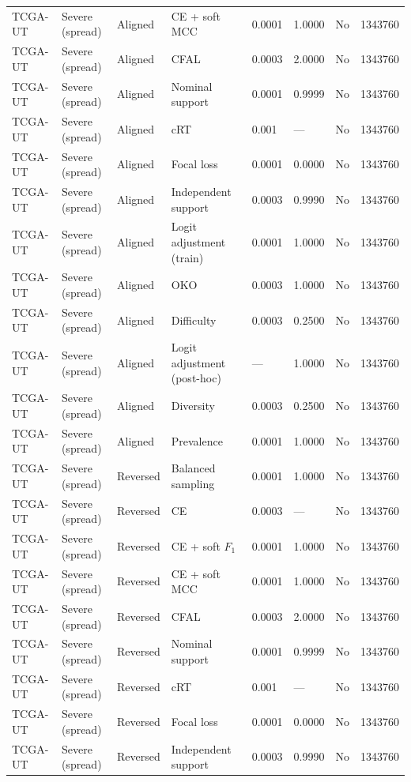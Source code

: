 \begin{longtable}{lllllllr}
TCGA-UT & Severe (spread) & Aligned & CE + soft MCC & 0.0001 & 1.0000 & No & 1343760 \\
TCGA-UT & Severe (spread) & Aligned & CFAL & 0.0003 & 2.0000 & No & 1343760 \\
TCGA-UT & Severe (spread) & Aligned & Nominal support & 0.0001 & 0.9999 & No & 1343760 \\
TCGA-UT & Severe (spread) & Aligned & cRT & 0.001 & --- & No & 1343760 \\
TCGA-UT & Severe (spread) & Aligned & Focal loss & 0.0001 & 0.0000 & No & 1343760 \\
TCGA-UT & Severe (spread) & Aligned & Independent support & 0.0003 & 0.9990 & No & 1343760 \\
TCGA-UT & Severe (spread) & Aligned & Logit adjustment (train) & 0.0001 & 1.0000 & No & 1343760 \\
TCGA-UT & Severe (spread) & Aligned & OKO & 0.0003 & 1.0000 & No & 1343760 \\
TCGA-UT & Severe (spread) & Aligned & Difficulty & 0.0003 & 0.2500 & No & 1343760 \\
TCGA-UT & Severe (spread) & Aligned & Logit adjustment (post-hoc) & --- & 1.0000 & No & 1343760 \\
TCGA-UT & Severe (spread) & Aligned & Diversity & 0.0003 & 0.2500 & No & 1343760 \\
TCGA-UT & Severe (spread) & Aligned & Prevalence & 0.0001 & 1.0000 & No & 1343760 \\
TCGA-UT & Severe (spread) & Reversed & Balanced sampling & 0.0001 & 1.0000 & No & 1343760 \\
TCGA-UT & Severe (spread) & Reversed & CE & 0.0003 & --- & No & 1343760 \\
TCGA-UT & Severe (spread) & Reversed & CE + soft $F_1$ & 0.0001 & 1.0000 & No & 1343760 \\
TCGA-UT & Severe (spread) & Reversed & CE + soft MCC & 0.0001 & 1.0000 & No & 1343760 \\
TCGA-UT & Severe (spread) & Reversed & CFAL & 0.0003 & 2.0000 & No & 1343760 \\
TCGA-UT & Severe (spread) & Reversed & Nominal support & 0.0001 & 0.9999 & No & 1343760 \\
TCGA-UT & Severe (spread) & Reversed & cRT & 0.001 & --- & No & 1343760 \\
TCGA-UT & Severe (spread) & Reversed & Focal loss & 0.0001 & 0.0000 & No & 1343760 \\
TCGA-UT & Severe (spread) & Reversed & Independent support & 0.0003 & 0.9990 & No & 1343760 \\

\end{longtable}
